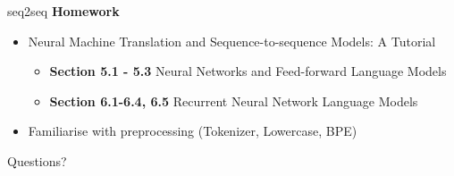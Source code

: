 \documentclass[xcolor=pdftex,dvipsnames,table]{beamer}
\begin{document}
	\begin{frame}{seq2seq}
	\textbf{Homework}
	\begin{itemize}
	\item Neural Machine Translation and Sequence-to-sequence Models: A Tutorial
	\begin{itemize}
	\item \textbf{Section 5.1 - 5.3} Neural Networks and Feed-forward Language Models
	\item \textbf{Section 6.1-6.4, 6.5} Recurrent Neural Network Language Models
	\end{itemize}
	\item Familiarise with preprocessing (Tokenizer, Lowercase, BPE)
	\end{itemize}
	\end{frame}
	
	\setcounter{finalframe}{\value{framenumber}}
	
	
	{
    \begin{frame}[plain]{Questions?}
    \end{frame}
  	}
	
	



	

	\setcounter{framenumber}{\value{finalframe}}
	
	
\end{document}
